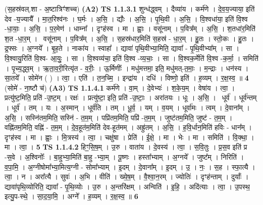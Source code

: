 \documentclass[17pt]{extarticle}
\begin{document}
                  \newline
                      (स॒हस्र॑वल्.शा - अ॒ष्टात्रिꣳ॑शच्च)  \textbf{(A2)} \newline \newline
                                \textbf{ TS 1.1.3.1} \newline
                  शुन्ध॑द्ध्वम् । दैव्या॑य । कर्म॑णे । दे॒व॒य॒ज्याया॒ इति॑ देव -य॒ज्यायै᳚ । मा॒त॒रिश्व॑नः । घ॒र्मः । अ॒सि॒ । द्यौः । अ॒सि॒ । पृ॒थि॒वी । अ॒सि॒ । वि॒श्वधा॑या॒ इति॑ वि॒श्व -धा॒याः॒ । अ॒सि॒ । प॒र॒मेण॑ । धाम्ना᳚ । दृꣳह॑स्व । मा । ह्वाः॒ । वसू॑नाम् । प॒वित्र᳚म् । अ॒सि॒ । श॒तधा॑र॒मिति॑ श॒त -धा॒र॒म् ।  वसू॑नाम् । प॒वित्र᳚म् । अ॒सि॒ । स॒हस्र॑धार॒मिति॑ स॒हस्र॑ - धा॒र॒म् । हु॒तः । स्तो॒कः । हु॒तः । द्र॒फ्सः । अ॒ग्नये᳚ । बृ॒ह॒ते । नाका॑य । स्वाहा᳚ । द्यावा॑ पृथि॒वीभ्या॒मिति॒ द्यावा᳚ - पृ॒थि॒वीभ्या᳚म् । सा । वि॒श्वायु॒रिति॑ वि॒श्व- आ॒युः॒ । सा । वि॒श्वव्य॑चा॒ इति॑ वि॒श्व -व्य॒चाः॒ । सा । वि॒श्वक॒र्मेति॑ वि॒श्व -क॒र्मा॒ । समिति॑ । पृ॒च्य॒द्ध्व॒म् । ऋ॒ता॒व॒री॒रित्यृ॑त - व॒रीः॒ । ऊ॒र्मिणीः᳚ । मधु॑मत्तमा॒ इति॒ मधु॑मत्-त॒माः॒ । म॒न्द्राः । धन॑स्य । सा॒तये᳚ । सोमे॑न ( ) । त्वा॒ । एति॑ । त॒न॒च्मि॒ । इन्द्रा॑य । दधि॑ । विष्णो॒ इति॑ । ह॒व्यम् । र॒क्ष॒स्व॒ ॥ \textbf{  4 } \newline
                  \newline
                      (सोमे॑ - ना॒ष्टौ च॑)  \textbf{(A3)} \newline \newline
                                \textbf{ TS 1.1.4.1} \newline
                  कर्म॑णे । वा॒म् । दे॒वेभ्यः॑ । श॒के॒य॒म् । वेषा॑य । त्वा॒ । प्रत्यु॑ष्ट॒मिति॒ प्रति॑ -उ॒ष्ट॒म् । रक्षः॑ । प्रत्यु॑ष्टा॒ इति॒ प्रति॑ -उ॒ष्टाः॒ । अरा॑तयः । धूः । अ॒सि॒ ।  धूर्व॑ । धूर्व॑न्तम् । धूर्व॑ । तम् । यः । अ॒स्मान् । धूर्व॑ति । तम् । धू॒र्व॒ । यम् । व॒यम् । धूर्वा॑मः । त्वम् । दे॒वाना᳚म् । अ॒सि॒ । सस्नि॑तम॒मिति॒ सस्नि॑ - त॒म॒म् । पप्रि॑तम॒मिति॒ पप्रि॑ -त॒म॒म् । जुष्ट॑तम॒मिति॒ जुष्ट॑ - त॒म॒म् । वह्नि॑तम॒मिति॒ वह्नि॑ - त॒म॒म् । दे॒व॒हूत॑म॒मिति॑ देव-हूत॑मम् । अह्रु॑तम् । अ॒सि॒ । ह॒वि॒र्धान॒मिति॑ हविः - धान᳚म् । दृꣳह॑स्व । मा । ह्वाः॒ । मि॒त्रस्य॑ । त्वा॒ । चक्षु॑षा । प्रेति॑ । ई॒क्षे॒ । मा । भेः । मा । समिति॑ । वि॒क्था॒ । मा । त्वा॒ । \textbf{  5} \newline
                  \newline
                                \textbf{ TS 1.1.4.2} \newline
                  हिꣳ॒॒सि॒ष॒म् । उ॒रु । वाता॑य । दे॒वस्य॑ । त्वा॒ । स॒वि॒तुः । प्र॒स॒व इति॑ प्र -स॒वे । अ॒श्विनोः᳚ । बा॒हुभ्या॒मिति॑ बा॒हु -भ्या॒म् । पू॒ष्णः । हस्ता᳚भ्याम् । अ॒ग्नये᳚ । जुष्ट᳚म् । निरिति॑ । व॒पा॒मि॒ । अ॒ग्नीषोमा᳚भ्या॒मित्य॒ग्नी - सोमा᳚भ्याम् । इ॒दम् । दे॒वाना᳚म् । इ॒दम् । उ॒ । नः॒ । स॒ह । स्फा॒त्यै । त्वा॒ । न । अरा᳚त्यै । सुवः॑ । अ॒भि । वीति॑ । ख्ये॒ष॒म् । वै॒श्वा॒न॒रम् । ज्योतिः॑ । दृꣳह॑न्ताम् । दुर्याः᳚ । द्यावा॑पृथि॒व्योरिति॒ द्यावा᳚ - पृ॒थि॒व्योः । उ॒रु । अ॒न्तरि॑क्षम् । अन्विति॑ । इ॒हि॒ । अदि॑त्याः । त्वा॒ । उ॒पस्थ॒ इत्यु॒प-स्थे॒ । सा॒द॒या॒मि॒ । अग्ने᳚ । ह॒व्यम् । र॒क्ष॒स्व॒ ॥ \textbf{  6 } \newline
\end{document}
